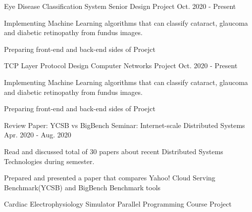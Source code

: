 
\begin{cventries}

  \cventry
   {Eye Disease Classification System} %
    {Senior Design Project} %
    {} %
    {Oct. 2020 - Present} %
    {
      \begin{cvitems} %
      	\item {Implementing Machine Learning algorithms that can classify cataract, glaucoma and diabetic retinopathy from fundus images.}
      	\item {Preparing front-end and back-end sides of Proejct  }
      \end{cvitems}
    }
\cventry
   {TCP Layer Protocol Design} %
    {Computer Networks Project} %
    {} %
    {Oct. 2020 - Present} %
    {
      \begin{cvitems} %
      	\item {Implementing Machine Learning algorithms that can classify cataract, glaucoma and diabetic retinopathy from fundus images.}
      	\item {Preparing front-end and back-end sides of Proejct  }
      \end{cvitems}
    }
\cventry
   {Review Paper: YCSB vs BigBench} %
    {Seminar: Internet-scale Distributed Systems} %
    {} %
    {Apr. 2020 - Aug. 2020} %
    {
      \begin{cvitems} %
      	\item {Read and discussed total of 30 papers about recent Distributed Systems Technologies during semester.}
      	\item {Prepared and presented a paper that compares Yahoo! Cloud Serving Benchmark(YCSB) and BigBench Benchmark tools}
      \end{cvitems}
    }
  \cventry
   {Cardiac Electrophysiology Simulator} %
    {Parallel Programming Course Project} %

\end{cventries}
